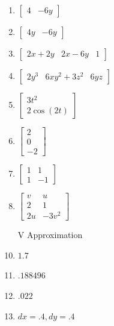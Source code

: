 \documentclass[10pt]{amsart}
\begin{document}
\begin{multicols}{2}
\begin{enumerate}
\item $\begin{bmatrix}4 & -6y\end{bmatrix}$
\item $\begin{bmatrix}4y & -6y\end{bmatrix}$
\item $\begin{bmatrix}2x+2y & 2x-6y & 1\end{bmatrix}$
\item $\begin{bmatrix}2y^3 & 6xy^2+3z^2 & 6yz\end{bmatrix}$
\item $\begin{bmatrix}3t^2\\ 2\cos(2t)\end{bmatrix}$
\item $\begin{bmatrix}2\\0\\-2\end{bmatrix}$
\item $\begin{bmatrix}1&1\\1&-1\end{bmatrix}$
\item $\begin{bmatrix}v&u\\2&1\\2u&-3v^2\end{bmatrix}$


\item[V]Approximation
\item $1.7$
\item $.188496$
\item $.022$
\item $dx=.4,dy=.4$



\end{enumerate}
\end{multicols}
\end{document}
